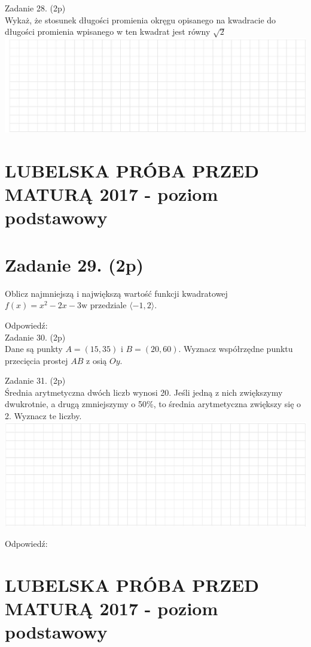\documentclass[10pt]{article}
\begin{document}
Zadanie 28. (2p)\\
Wykaż, że stosunek długości promienia okręgu opisanego na kwadracie do długości promienia wpisanego w ten kwadrat jest równy \(\sqrt{2}\)\\
\includegraphics[max width=\textwidth, center]{2024_11_21_2a465a6670163fcfd70dg-09}

\section*{LUBELSKA PRÓBA PRZED MATURĄ 2017 - poziom podstawowy}
\section*{Zadanie 29. (2p)}
Oblicz najmniejszą i największą wartość funkcji kwadratowej \(f(x)=x^{2}-2 x-3 \mathrm{w}\) przedziale \(\langle-1,2\rangle\).

Odpowiedź:\\
Zadanie 30. (2p)\\
Dane są punkty \(A=(15,35)\) i \(B=(20,60)\). Wyznacz współrzędne punktu przecięcia prostej \(A B\) z osią \(O y\).

Zadanie 31. (2p)\\
Średnia arytmetyczna dwóch liczb wynosi 20. Jeśli jedną z nich zwiększymy dwukrotnie, a drugą zmniejszymy o 50\%, to średnia arytmetyczna zwiększy się o 2. Wyznacz te liczby.\\
\includegraphics[max width=\textwidth, center]{2024_11_21_2a465a6670163fcfd70dg-10}

Odpowiedź:

\section*{LUBELSKA PRÓBA PRZED MATURĄ 2017 - poziom podstawowy}
\end{document}
